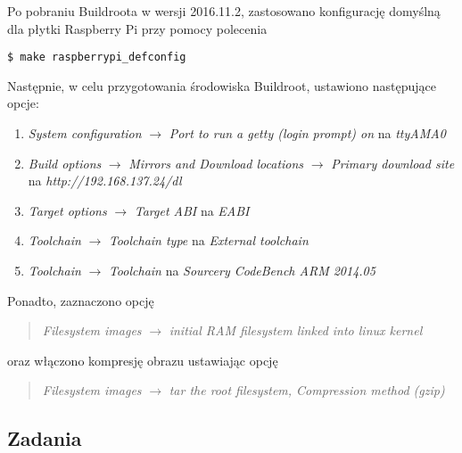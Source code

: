 \documentclass[10pt,a4paper]{article}
\begin{document}
\newpage\noindent
Po pobraniu Buildroota w wersji 2016.11.2, zastosowano konfigurację domyślną dla płytki Raspberry Pi przy pomocy polecenia
\begin{lstlisting}[style=bash]
$ make raspberrypi_defconfig
\end{lstlisting}
Następnie, w celu przygotowania środowiska Buildroot, ustawiono następujące opcje:
\begin{enumerate}
	\item \textit{System configuration} $\rightarrow$ \textit{Port to run a getty (login prompt) on} na \textit{ttyAMA0}
	\item \textit{Build options} $\rightarrow$ \textit{Mirrors and Download locations} $\rightarrow$ \textit{Primary download site}\\
	na \textit{http://192.168.137.24/dl}
	\item \textit{Target options} $\rightarrow$ \textit{Target ABI} na \textit{EABI}
	\item \textit{Toolchain} $\rightarrow$ \textit{Toolchain type} na \textit{External toolchain}
	\item \textit{Toolchain} $\rightarrow$ \textit{Toolchain} na \textit{Sourcery CodeBench ARM 2014.05}
\end{enumerate}
Ponadto, zaznaczono opcję
\begin{quote}
	\textit{Filesystem images} $\rightarrow$ \textit{initial RAM filesystem linked into linux kernel}
\end{quote}
oraz włączono kompresję obrazu ustawiając opcję
\begin{quote}
	\textit{Filesystem images} $\rightarrow$ \textit{tar the root filesystem, Compression method (gzip)}
\end{quote}

\subsection{Zadania}
\end{document}
